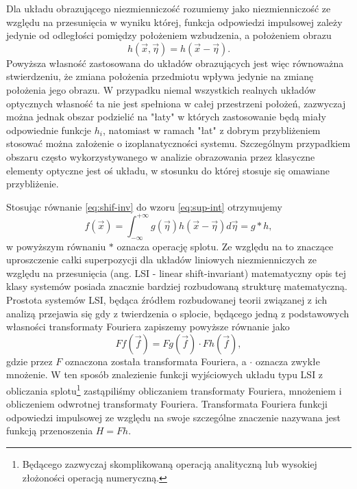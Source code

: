 Dla układu obrazującego niezmienniczość rozumiemy jako niezmienniczość ze względu na przesunięcia w wyniku której, funkcja odpowiedzi impulsowej zależy jedynie od odległości pomiędzy położeniem wzbudzenia, a położeniem obrazu
\begin{equation}
h(\vec{x},\vec{\eta})=h(\vec{x}-\vec{\eta}).
\label{eq:shif-inv}
\end{equation}
Powyższa własność zastosowana do układów obrazujących jest więc równoważna stwierdzeniu, że zmiana położenia przedmiotu wpływa jedynie na zmianę położenia jego obrazu. W przypadku niemal wszystkich realnych układów optycznych własność ta nie jest spełniona w całej przestrzeni położeń, zazwyczaj można jednak obszar podzielić na "łaty" w których zastosowanie będą miały odpowiednie funkcje $h_i$, natomiast w ramach "łat" z dobrym przybliżeniem stosować można założenie o izoplanatyczności systemu. Szczególnym przypadkiem obszaru często wykorzystywanego w analizie obrazowania przez klasyczne elementy optyczne jest oś układu, w stosunku do której stosuje się omawiane przybliżenie.

Stosując równanie \ref{eq:shif-inv} do wzoru \ref{eq:sup-int} otrzymujemy
\begin{equation}
f(\vec{x})=\int_{-\infty}^{+\infty} g(\vec{\eta})  h(\vec{x}-\vec{\eta}) d \vec{\eta} = g \ast h,
\label{eq:splot}
\end{equation}
w powyższym równaniu $\ast$ oznacza operację splotu. Ze względu na to znaczące uproszczenie całki superpozycji dla układów liniowych niezmienniczych ze względu na przesunięcia (ang. LSI - linear shift-invariant) matematyczny opis tej klasy systemów posiada znacznie bardziej rozbudowaną strukturę matematyczną. Prostota systemów LSI, będąca źródłem rozbudowanej teorii związanej z ich analizą przejawia się gdy z twierdzenia o splocie, będącego jedną z podstawowych własności transformaty Fouriera zapiszemy powyższe równanie jako
\begin{equation}
F{f}(\vec{f}) = F{g}(\vec{f}) \cdot F{h}(\vec{f}),
\label{eq:transfer-mult}
\end{equation}
gdzie przez $F$ oznaczona została transformata Fouriera, a $\cdot$ oznacza zwykłe mnożenie. W ten sposób znalezienie funkcji wyjściowych układu typu LSI z obliczania splotu\footnote{Będącego zazwyczaj skomplikowaną operacją analityczną lub wysokiej złożoności operacją numeryczną.} zastąpiliśmy obliczaniem transformaty Fouriera, mnożeniem i obliczeniem odwrotnej transformaty Fouriera. Transformata Fouriera funkcji odpowiedzi impulsowej ze względu na swoje szczególne znaczenie nazywana jest funkcją przenoszenia $H=F{h}$.

